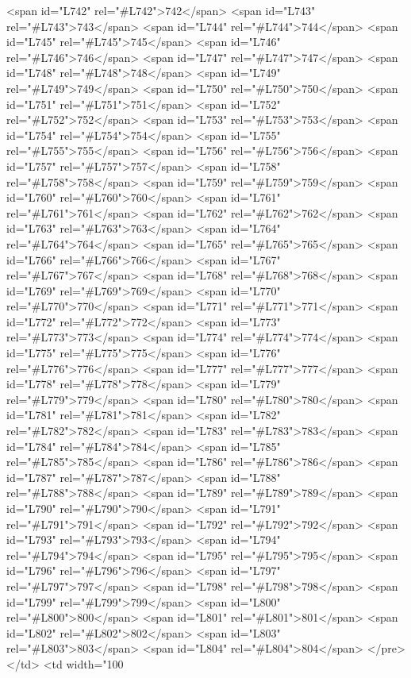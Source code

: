 <span id="L742" rel="#L742">742</span>
<span id="L743" rel="#L743">743</span>
<span id="L744" rel="#L744">744</span>
<span id="L745" rel="#L745">745</span>
<span id="L746" rel="#L746">746</span>
<span id="L747" rel="#L747">747</span>
<span id="L748" rel="#L748">748</span>
<span id="L749" rel="#L749">749</span>
<span id="L750" rel="#L750">750</span>
<span id="L751" rel="#L751">751</span>
<span id="L752" rel="#L752">752</span>
<span id="L753" rel="#L753">753</span>
<span id="L754" rel="#L754">754</span>
<span id="L755" rel="#L755">755</span>
<span id="L756" rel="#L756">756</span>
<span id="L757" rel="#L757">757</span>
<span id="L758" rel="#L758">758</span>
<span id="L759" rel="#L759">759</span>
<span id="L760" rel="#L760">760</span>
<span id="L761" rel="#L761">761</span>
<span id="L762" rel="#L762">762</span>
<span id="L763" rel="#L763">763</span>
<span id="L764" rel="#L764">764</span>
<span id="L765" rel="#L765">765</span>
<span id="L766" rel="#L766">766</span>
<span id="L767" rel="#L767">767</span>
<span id="L768" rel="#L768">768</span>
<span id="L769" rel="#L769">769</span>
<span id="L770" rel="#L770">770</span>
<span id="L771" rel="#L771">771</span>
<span id="L772" rel="#L772">772</span>
<span id="L773" rel="#L773">773</span>
<span id="L774" rel="#L774">774</span>
<span id="L775" rel="#L775">775</span>
<span id="L776" rel="#L776">776</span>
<span id="L777" rel="#L777">777</span>
<span id="L778" rel="#L778">778</span>
<span id="L779" rel="#L779">779</span>
<span id="L780" rel="#L780">780</span>
<span id="L781" rel="#L781">781</span>
<span id="L782" rel="#L782">782</span>
<span id="L783" rel="#L783">783</span>
<span id="L784" rel="#L784">784</span>
<span id="L785" rel="#L785">785</span>
<span id="L786" rel="#L786">786</span>
<span id="L787" rel="#L787">787</span>
<span id="L788" rel="#L788">788</span>
<span id="L789" rel="#L789">789</span>
<span id="L790" rel="#L790">790</span>
<span id="L791" rel="#L791">791</span>
<span id="L792" rel="#L792">792</span>
<span id="L793" rel="#L793">793</span>
<span id="L794" rel="#L794">794</span>
<span id="L795" rel="#L795">795</span>
<span id="L796" rel="#L796">796</span>
<span id="L797" rel="#L797">797</span>
<span id="L798" rel="#L798">798</span>
<span id="L799" rel="#L799">799</span>
<span id="L800" rel="#L800">800</span>
<span id="L801" rel="#L801">801</span>
<span id="L802" rel="#L802">802</span>
<span id="L803" rel="#L803">803</span>
<span id="L804" rel="#L804">804</span>
</pre>
          </td>
          <td width="100%
